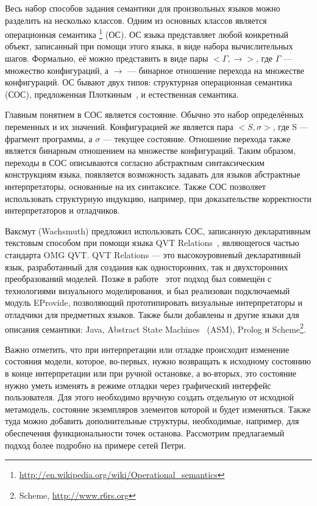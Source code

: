 \documentclass[a5paper]{article}
\begin{document}
Весь набор способов задания семантики для произвольных языков можно разделить на несколько классов. Одним из основных классов является операционная семантика \footnote{\url{http://en.wikipedia.org/wiki/Operational_semantics}} (ОС). ОС языка представляет любой конкретный объект, записанный при помощи этого языка, в виде набора вычислительных шагов. Формально, её можно представить в виде пары $<\Gamma, \to>$, где $\Gamma$ --- множество конфигураций, а $\to$ — бинарное отношение перехода на множестве конфигураций. ОС бывают двух типов: структурная операционная семантика (СОС), предложенная Плоткиным~\cite{plotkin}, и естественная семантика.

Главным понятием в СОС является состояние. Обычно это набор определённых переменных и их значений. Конфигурацией же является пара $<S, \sigma>$, где S --- фрагмент программы, а $\sigma$  — текущее состояние. Отношение перехода также является бинарным отношением на множестве конфигураций. Таким образом, переходы в СОС описываются согласно абстрактным синтаксическим конструкциям языка, появляется возможность задавать для языков абстрактные интерпретаторы, основанные на их синтаксисе. Также СОС позволяет использовать структурную индукцию, например, при доказательстве корректности интерпретаторов и отладчиков.

Ваксмут (Wachsmuth) предложил использовать СОС, записанную декларативным текстовым способом при помощи языка QVT Relations~\cite{qvt}, являющегося частью стандарта OMG QVT. QVT Relations --- это высокоуровневый декларативный язык, разработанный для создания как односторонних, так и двухсторонних преобразований моделей. Позже в работе~\cite{wachsmuth1} этот подход был совмещён с технологиями визуального моделирования, и был реализован подключаемый модуль EProvide, позволяющий прототипировать визуальные интерпретаторы и отладчики для предметных языков. Также были добавлены и другие языки для описания семантики: Java, Abstract State Machines~\cite{asm} (ASM), Prolog и Scheme\footnote{Scheme, \url{http://www.r6rs.org}}.

Важно отметить, что при интерпретации или отладке происходит изменение состояния модели, которое, во-первых, нужно возвращать к исходному состоянию в конце интерпретации или при ручной остановке, а во-вторых, это состояние нужно уметь изменять в режиме отладки через графический интерфейс пользователя. Для этого необходимо вручную создать отдельную от исходной метамодель, состояние экземпляров элементов которой и будет изменяться. Также туда можно добавить дополнительные структуры, необходимые, например, для обеспечения функциональности точек останова. Рассмотрим предлагаемый подход более подробно на примере сетей Петри.
\end{document}
